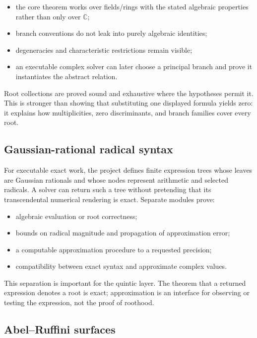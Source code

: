 \documentclass[
  10pt,
  a4paper,
  twoside,
  open=any,
  parskip=half,
  headings=big
]{scrreprt}
\begin{document}
\begin{itemize}
  \item the core theorem works over fields/rings with the stated algebraic
        properties rather than only over \(\mathbb C\);
  \item branch conventions do not leak into purely algebraic identities;
  \item degeneracies and characteristic restrictions remain visible;
  \item an executable complex solver can later choose a principal branch and
        prove it instantiates the abstract relation.
\end{itemize}

Root collections are proved sound and exhaustive where the hypotheses permit
it.  This is stronger than showing that substituting one displayed formula
yields zero: it explains how multiplicities, zero discriminants, and branch
families cover every root.

\subsection{Gaussian-rational radical syntax}

For executable exact work, the project defines finite expression trees whose
leaves are Gaussian rationals and whose nodes represent arithmetic and selected
radicals.  A solver can return such a tree without pretending that its
transcendental numerical rendering is exact.  Separate modules prove:

\begin{itemize}
  \item algebraic evaluation or root correctness;
  \item bounds on radical magnitude and propagation of approximation error;
  \item a computable approximation procedure to a requested precision;
  \item compatibility between exact syntax and approximate complex values.
\end{itemize}

This separation is important for the quintic layer.  The theorem that a
returned expression denotes a root is exact; approximation is an interface
for observing or testing the expression, not the proof of roothood.

\subsection{Abel--Ruffini surfaces}
\end{document}
